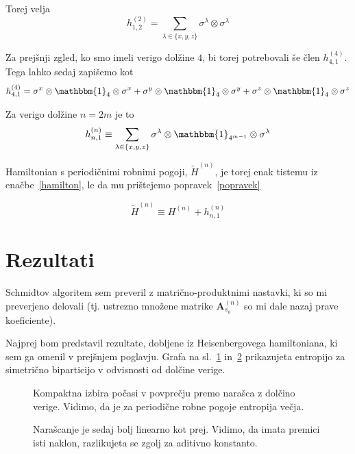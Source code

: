 \documentclass[12pt, a4paper]{article}
\begin{document}
Torej velja
\[
	h^{(2)}_{1,2} = \sum_{\lambda \in \{x,y,z\}} \sigma^\lambda \otimes \sigma^\lambda
\]

Za prej\v snji zgled, ko smo imeli verigo dol\v zine $4$, bi torej potrebovali \v se \v clen
$h^{(4)}_{4,1}$. Tega lahko sedaj zapi\v semo kot
\[
	h^{(4)}_{4,1} = \sigma^x\otimes\mathbbm{1}_4\otimes\sigma^x +
		\sigma^y\otimes\mathbbm{1}_4\otimes\sigma^y +
		\sigma^z\otimes\mathbbm{1}_4\otimes\sigma^z
\]

Za verigo dol\v zine $n = 2m$ je to
\begin{equation}
	h^{(n)}_{n,1} \equiv \sum_{\lambda \in \{x,y,z\}} \sigma^\lambda \otimes
	\mathbbm{1}_{4^{m - 1}} \otimes \sigma^\lambda
	\label{popravek}
\end{equation}

Hamiltonian s periodi\v cnimi robnimi pogoji, $\tilde{H}^{(n)}$, je torej enak tistemu iz
ena\v cbe~\eqref{hamilton}, le da mu pri\v stejemo popravek~\eqref{popravek}

\begin{equation}
	\tilde{H}^{(n)} \equiv H^{(n)} + h^{(n)}_{n,1}
\end{equation}

\section{Rezultati}

Schmidtov algoritem sem preveril z matri\v cno-produktnimi nastavki, ki so mi preverjeno delovali
(tj. ustrezno mno\v zene matrike $\mathbf{A}_{s_n}^{(n)}$ so mi dale nazaj prave koeficiente).

Najprej bom predstavil rezultate, dobljene iz Heisenbergovega hamiltoniana, ki sem ga omenil v
prej\v snjem poglavju. Grafa na sl.~\ref{1-kompakten} in~\ref{1-nekompakten} prikazujeta entropijo
za simetri\v cno biparticijo v odvisnosti od dol\v cine verige.

\begin{figure}[H]\centering
	
	\caption{Kompaktna izbira po\v casi v povpre\v cju premo nara\v sca z dol\v cino verige.
		Vidimo, da je za periodi\v cne robne pogoje entropija ve\v cja.}
	\label{1-kompakten}
\end{figure}

\begin{figure}[H]\centering
	
	\caption{Nara\v scanje je sedaj bolj linearno kot prej. Vidimo, da imata premici isti naklon,
		razlikujeta se zgolj za aditivno konstanto.}
	\label{1-nekompakten}
\end{figure}
\end{document}
